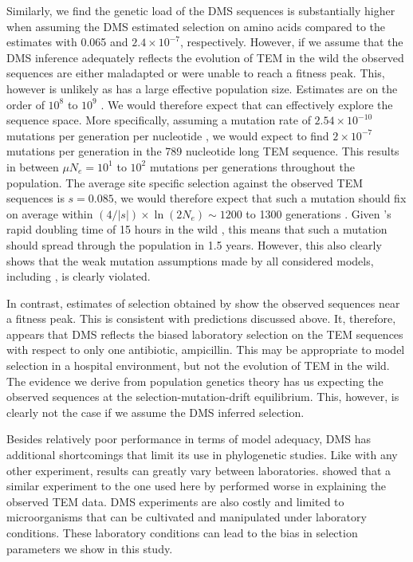 Similarly, we find the genetic load of the DMS sequences is substantially higher when assuming the DMS estimated selection on amino acids compared to the \selac estimates with 0.065 and  $2.4\times 10^{-7}$, respectively.
However, if we assume that the DMS inference adequately reflects the evolution of TEM in the wild the observed sequences are either maladapted or were unable to reach a fitness peak.
This, however is unlikely as \ecoli has a large effective population size.
Estimates are on the order of $10^8$ to $10^9$ \citep{OchmanAndWilson1987,hartl1994}.
We would therefore expect that \ecoli can effectively explore the sequence space.
More specifically, assuming a mutation rate of $2.54\times 10^{-10}$ mutations per generation per nucleotide \citep{lee2012}, we would expect to find $2\times 10^{-7}$ mutations per generation in the 789 nucleotide long TEM sequence.
This results in between $\mu N_e = 10^1$ to $10^2$ mutations per generations throughout the population.
The average site specific selection against the observed TEM sequences is $s = 0.085$, we would therefore expect that such a mutation should fix on average within $(4/|s|)\times \ln(2 N_e) \sim 1200$ to 1300 generations \citep{CrowAndKimura1970}.
Given \ecoli's rapid doubling time of 15 hours in the wild \citep{gibson2018}, this means that such a mutation should spread through the population in 1.5 years.
However, this also clearly shows that the weak mutation assumptions made by all considered models, including \selac, is clearly violated.

In contrast, estimates of selection obtained by \selac show the observed sequences near a fitness peak.
This is consistent with predictions discussed above.
It, therefore, appears that DMS reflects the biased laboratory selection on the TEM sequences with respect to only one antibiotic, ampicillin. 
This may be appropriate to model selection in a hospital environment, but not the evolution of TEM in the wild.
The evidence we derive from population genetics theory has us expecting the observed sequences at the selection-mutation-drift equilibrium.
This, however, is clearly not the case if we assume the DMS inferred selection.

Besides relatively poor performance in terms of model adequacy, DMS has additional shortcomings that limit its use in phylogenetic studies.
Like with any other experiment, results can greatly vary between laboratories.
\citet{hilton2017} showed that a similar experiment to the one used here by \citet{firnberg2014} performed worse in explaining the observed TEM data.
DMS experiments are also costly and limited to microorganisms that can be cultivated and manipulated under laboratory conditions.
These laboratory conditions can lead to the bias in selection parameters we show in this study.

